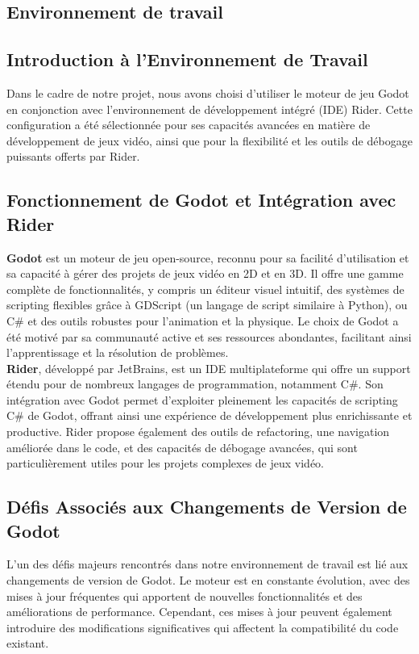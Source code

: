


\subsection{Environnement de travail}


\subsection*{Introduction à l'Environnement de Travail}
Dans le cadre de notre projet, nous avons choisi d'utiliser le moteur de jeu Godot en conjonction avec l'environnement de développement intégré (IDE) Rider.
 Cette configuration a été sélectionnée pour ses capacités avancées en matière de développement de jeux vidéo, ainsi que pour la flexibilité et les outils de 
 débogage puissants offerts par Rider.

 \subsection*{Fonctionnement de Godot et Intégration avec Rider}
\textbf{Godot} est un moteur de jeu open-source, reconnu pour sa facilité d'utilisation et sa capacité à 
gérer des projets de jeux vidéo en 2D et en 3D. Il offre une gamme complète de fonctionnalités, y compris un éditeur visuel intuitif,
 des systèmes de scripting flexibles grâce à GDScript (un langage de script similaire à Python), ou C\# et des outils robustes pour l'animation 
 et la physique. Le choix de Godot a été motivé par sa communauté active et ses ressources abondantes, facilitant ainsi l'apprentissage et la résolution de problèmes.
\\

 \textbf{Rider}, développé par JetBrains, est un IDE multiplateforme qui offre un support étendu pour de nombreux langages de programmation, notamment C\#. Son
  intégration avec Godot permet d'exploiter pleinement les capacités de scripting C\# de Godot, offrant ainsi une expérience de développement plus enrichissante et productive. Rider propose également des outils de refactoring, une navigation améliorée dans le code, et des capacités de débogage avancées, qui sont particulièrement utiles pour les projets complexes de jeux vidéo.

\subsection*{Défis Associés aux Changements de Version de Godot}
L'un des défis majeurs rencontrés dans notre environnement de travail est lié aux changements de version de Godot. Le moteur est en constante évolution, 
avec des mises à jour fréquentes qui apportent de nouvelles fonctionnalités et des améliorations de performance. Cependant, ces mises à jour peuvent 
également introduire des modifications significatives qui affectent la compatibilité du code existant.
\\

